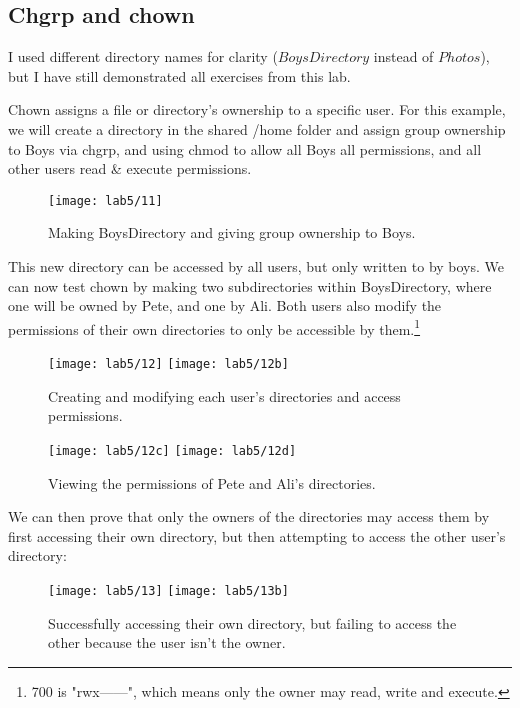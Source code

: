 \subsection{Chgrp and chown}\label{subsec:using-chown}
\begin{tcolorbox}[colback=orange!5!white,colframe=orange!75!black,title=Note]
    I used different directory names for clarity ($BoysDirectory$ instead of $Photos$),
    but I have still demonstrated all exercises from this lab.
\end{tcolorbox}
Chown assigns a file or directory's ownership to a specific user.
For this example, we will create a directory in the shared /home folder and assign group ownership
to Boys via chgrp, and using chmod to allow all Boys all permissions, and all other users
read \& execute permissions.

\begin{figure}[H]
    \centering
    \texttt{[image: lab5/11]}
    \caption{Making BoysDirectory and giving group ownership to Boys.}
    \label{fig:BoysDirectory}
\end{figure}

This new directory can be accessed by all users, but only written to by boys.
We can now test chown by making two subdirectories within BoysDirectory, where one will be owned
by Pete, and one by Ali.
Both users also modify the permissions of their own directories to only be accessible
by them.\footnote{700 is "rwx------", which means only the owner may read,
write and execute.}

\begin{figure}[H]
    \centering
    \texttt{[image: lab5/12]}
    \texttt{[image: lab5/12b]}
    \caption{Creating and modifying each user's directories and access permissions.}
    \label{fig:PeteAliDir}
\end{figure}

\begin{figure}[H]
    \centering
    \texttt{[image: lab5/12c]}
    \texttt{[image: lab5/12d]}
    \caption{Viewing the permissions of Pete and Ali's directories.}
    \label{fig:AliDirPerms}
\end{figure}

We can then prove that only the owners of the directories may access them by first accessing their
own directory, but then attempting to access the other user's directory:

\begin{figure}[H]
    \centering
    \texttt{[image: lab5/13]}
    \texttt{[image: lab5/13b]}
    \caption{Successfully accessing their own directory,
        but failing to access the other because the user isn't the owner.}
    \label{fig:PeteAliDirFail}
\end{figure}

